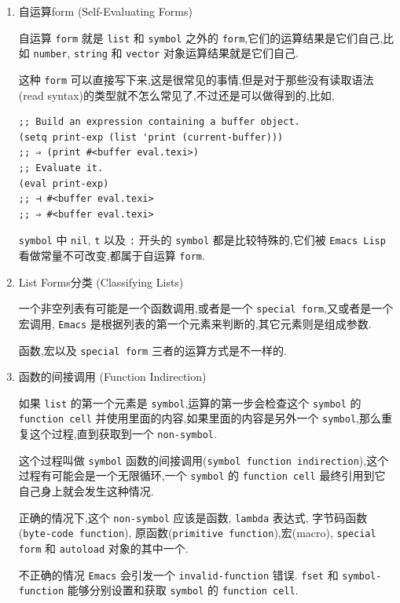 \documentclass[11pt]{article}
\begin{document}
\begin{enumerate}
\item 自运算form (Self-Evaluating Forms)
\label{sec:orgda9f61b}

自运算 \texttt{form} 就是 \texttt{list} 和 \texttt{symbol} 之外的 \texttt{form},它们的运算结果是它们自己,比如 \texttt{number}, \texttt{string} 和 \texttt{vector} 对象运算结果就是它们自己.

这种 \texttt{form} 可以直接写下来,这是很常见的事情,但是对于那些没有读取语法(read syntax)的类型就不怎么常见了,不过还是可以做得到的,比如,

\begin{verbatim}
;; Build an expression containing a buffer object.
(setq print-exp (list 'print (current-buffer)))
;; ⇒ (print #<buffer eval.texi>)
;; Evaluate it.
(eval print-exp)
;; ⊣ #<buffer eval.texi>
;; ⇒ #<buffer eval.texi>
\end{verbatim}

\texttt{symbol} 中 \texttt{nil}, \texttt{t} 以及 \texttt{:} 开头的 \texttt{symbol} 都是比较特殊的,它们被 \texttt{Emacs Lisp} 看做常量不可改变,都属于自运算 \texttt{form}.


\item List Forms分类 (Classifying Lists)
\label{sec:org5402598}

一个非空列表有可能是一个函数调用,或者是一个 \texttt{special form},又或者是一个宏调用, \texttt{Emacs} 是根据列表的第一个元素来判断的,其它元素则是组成参数.

函数,宏以及 \texttt{special form} 三者的运算方式是不一样的.


\item 函数的间接调用 (Function Indirection)
\label{sec:orgda2871a}

如果 \texttt{list} 的第一个元素是 \texttt{symbol},运算的第一步会检查这个 \texttt{symbol} 的 \texttt{function cell} 并使用里面的内容,如果里面的内容是另外一个 \texttt{symbol},那么重复这个过程,直到获取到一个 \texttt{non-symbol}.

这个过程叫做 \texttt{symbol} 函数的间接调用(\texttt{symbol function indirection}),这个过程有可能会是一个无限循环,一个 \texttt{symbol} 的 \texttt{function cell} 最终引用到它自己身上就会发生这种情况.

正确的情况下,这个 \texttt{non-symbol} 应该是函数, \texttt{lambda} 表达式, 字节码函数(\texttt{byte-code function}), 原函数(\texttt{primitive function}),宏(macro), \texttt{special form} 和 \texttt{autoload} 对象的其中一个.

不正确的情况 \texttt{Emacs} 会引发一个 \texttt{invalid-function} 错误. \texttt{fset} 和 \texttt{symbol-function} 能够分别设置和获取 \texttt{symbol} 的 \texttt{function cell}.


\end{enumerate}
\end{document}
